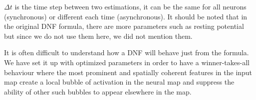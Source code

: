 $\Delta t$ is the time step between two estimations, it can be the same for all neurons (synchronous) or different each time (asynchronous). It should be noted that in the original DNF formula, there are more parameters such as resting potential but since we do not use them here, we did not mention them.

It is often difficult to understand how a DNF will behave just from the formula. We have set it up with optimized parameters in order to have a winner-takes-all behaviour where the most prominent and spatially coherent features in the input map create a local bubble of activation in the neural map and suppress the ability of other such bubbles to appear elsewhere in the map. 


